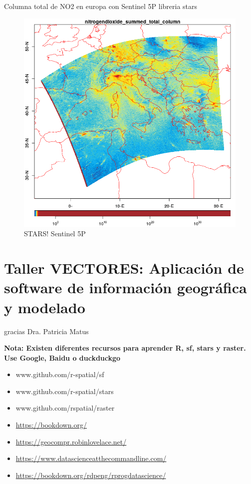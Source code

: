 \documentclass[]{book}
\providecommand{\tightlist}{%
  \setlength{\itemsep}{0pt}\setlength{\parskip}{0pt}}
\begin{document}
Columna total de NO2 en europa con Sentinel 5P libreria stars \citep{stars}

\begin{figure}
\includegraphics[width=1.5\linewidth]{figs/sentinel} \caption{STARS! Sentinel 5P}\label{fig:unnamed-chunk-31}
\end{figure}

\hypertarget{taller-vectores-aplicacion-de-software-de-informacion-geografica-y-modelado}{%
\chapter{Taller VECTORES: Aplicación de software de información geográfica y modelado}\label{taller-vectores-aplicacion-de-software-de-informacion-geografica-y-modelado}}

gracias Dra. Patricia Matus

\textbf{Nota: Existen diferentes recursos para aprender R, sf, stars y raster. Use Google, Baidu o duckduckgo}

\begin{itemize}
\tightlist
\item
  www.github.com/r-spatial/sf
\item
  www.github.com/r-spatial/stars
\item
  www.github.com/rspatial/raster
\item
  \url{https://bookdown.org/}
\item
  \url{https://geocompr.robinlovelace.net/}
\item
  \url{https://www.datascienceatthecommandline.com/}
\item
  \url{https://bookdown.org/rdpeng/rprogdatascience/}
\end{itemize}
\end{document}
